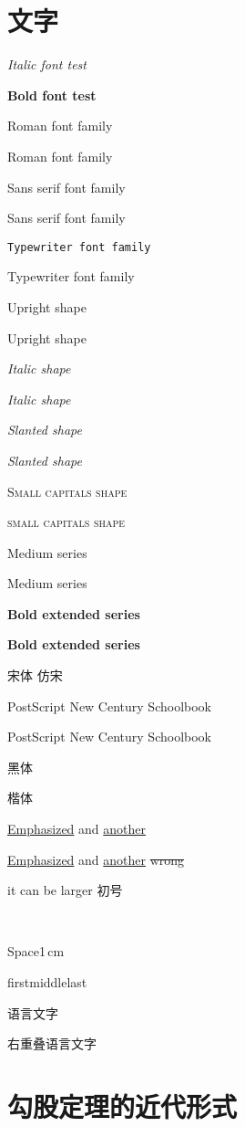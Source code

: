 \documentclass[UTF8]{ctexart}
\begin{document}
\section{文字}
\textit{Italic font test}\par
{\bfseries Bold font test}\par
\textrm{Roman font family}\par
{\rmfamily Roman font family}\par
\textsf{Sans serif font family}\par
{\sffamily Sans serif font family}\par
\texttt{Typewriter font family}\par
{\ttfamily Typewriter font family}\par
\textup{Upright shape}\par
{\upshape Upright shape}\par
\textit{Italic shape}\par
{\itshape Italic shape}\par
\textsl{Slanted shape}\par
{\slshape Slanted shape}\par
\textsc{Small capitals shape}\par
{\scshape small capitals shape}\par
\textmd{Medium series}\par
{\mdseries Medium series}\par
\textbf{Bold extended series}\par
{\bfseries Bold extended series}\par
{\songti 宋体}  \quad
{\fangsong 仿宋} 

\fontsize{14}{17}
\selectfont
PostScript New Century Schoolbook

PostScript New Century Schoolbook





{黑体}

{楷体}

\underline{Emphasized} and \underline{another}

\uline{Emphasized} and \uline{another}
 \qquad {} \qquad \sout{wrong} 
  

it can be {\Huge larger}
{初号}

\thinspace \,

Space\hspace{1cm}1\,cm 

first\hfill middle\hfill last

语言文字


右重叠语言文字



\section{勾股定理的近代形式}


\end{document}
